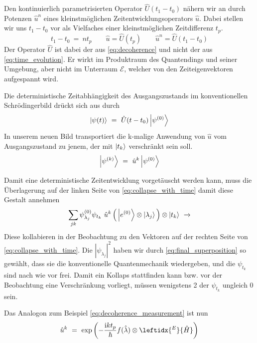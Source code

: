 \documentclass[12pt]{article}
\begin{document}
Den kontinuierlich parametrisierten Operator $\hat{U}(t_1-t_0)$ nähern wir an durch Potenzen $\hat{u}^n$ eines kleinstmöglichen Zeitentwicklungsoperators $\hat{u}$. Dabei stellen wir uns $t_1-t_0$ vor als Vielfaches einer kleinstmöglichen Zeitdifferenz $t_p$.
\begin{equation*}
t_1-t_0\ =\ n t_p \quad\quad 
\hat{u} = \hat{U}(t_p) \quad\quad 
\hat{u}^n = \hat{U}(t_1-t_0)
\end{equation*}
Der Operator $\hat{U}$ ist dabei der aus \eqref{eq:decoherence} und nicht der aus \eqref{eq:time_evolution}. Er wirkt im Produktraum des Quantendings und seiner Umgebung, aber nicht im Unterraum $\mathscr{E}$, welcher von den Zeiteigenvektoren aufgespannt wird.

Die deterministische Zeitabhängigkeit des Ausgangszustands im konventionellen Schrödingerbild drückt sich aus durch
\begin{equation*}
\ket{\psi(t)}\ =\ \hat{U}(t-t_0)\ket{\psi^{(0)}}
\end{equation*} 
In unserem neuen Bild transportiert die k-malige Anwendung von $\hat{u}$ vom Ausgangszustand zu jenem, der mit $\ket{t_k}$ verschränkt sein soll.
\begin{equation*}
\ket{\psi^{(k)}}\ =\ \hat{u}^k \ket{\psi^{(0)}}
\end{equation*} 

Damit eine deterministische Zeitentwicklung vorgetäuscht werden kann, muss die Überlagerung auf der linken Seite von \eqref{eq:collapse_with_time} damit diese Gestalt annehmen
\begin{equation}
\label{eq:final_superposition}
\sum_{jk} \psi_{\lambda_j}^{(0)}\psi_{t_k}\ \hat{u}^{k} \left(\,\ket{e^{(0)}} \otimes \ket{\lambda_j} \,\right) \otimes \ket{t_k}
\ \xrightarrow{}
\end{equation}
Diese kollabieren in der Beobachtung zu den Vektoren auf der rechten Seite von  \eqref{eq:collapse_with_time}. Die $|\psi_{\lambda_j}|^2$ haben wir durch \eqref{eq:final_superposition} so gewählt, dass sie die konventionelle Quantenmechanik wiedergeben, und die $\psi_{t_k}$ sind nach wie vor frei. Damit ein Kollaps stattfinden kann bzw. vor der Beobachtung eine Verschränkung vorliegt, müssen wenigstens 2 der $\psi_{t_k}$ ungleich 0 sein. 

Das Analogon zum Beispiel \eqref{eq:decoherence_measurement} ist nun
\begin{equation}
\label{eq:decoherence_measurement_new}
\hat{u}^k\ =\ \mathrm{exp}\left(-\frac{\mathrm{i}k t_p}{\hbar}f(\hat{\lambda})\otimes \leftidx{^E}{\hat{H}}\right)
\end{equation}
\end{document}
